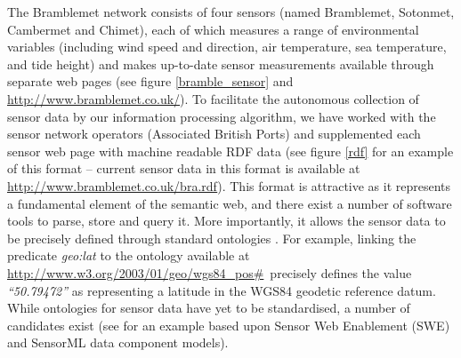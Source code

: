 \documentclass{acmtrans2m}
\begin{document}
\noindent The Bramblemet network consists of four sensors (named Bramblemet, Sotonmet, Cambermet and Chimet), each of which measures a range of environmental variables (including wind speed and direction, air temperature, sea temperature, and tide height) and makes up-to-date sensor measurements available through separate web pages (see figure \ref{bramble_sensor} and \small\url{http://www.bramblemet.co.uk/}\normalsize). To facilitate the autonomous collection of sensor data by our information processing algorithm, we have worked with the sensor network operators (Associated British Ports) and supplemented each sensor web page with machine readable RDF data (see figure \ref{rdf} for an example of this format -- current sensor data in this format is available at \small\url{http://www.bramblemet.co.uk/bra.rdf}\normalsize). This format is attractive as it represents a fundamental element of the semantic web, and there exist a number of software tools to parse, store and query it. More importantly, it allows the sensor data to be precisely defined through standard ontologies \cite{rdf}. For example, linking the predicate {\em geo:lat} to the ontology available at \small\url{http://www.w3.org/2003/01/geo/wgs84_pos#}\normalsize ~precisely defines the value {\em ``50.79472''} as representing a latitude in the WGS84 geodetic reference datum. While ontologies for sensor data have yet to be standardised, a number of candidates exist (see \cite{sensor_rdf} for an example based upon Sensor Web Enablement (SWE) and SensorML data component models).
\end{document}
